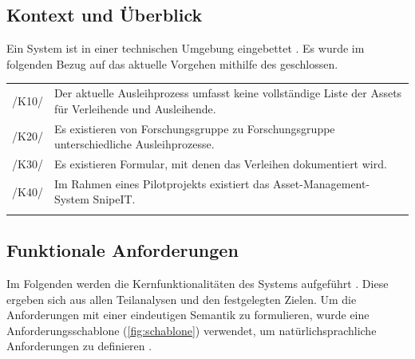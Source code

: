 \vspace*{-1.5cm}
\subsection{Kontext und Überblick}
\label{section:kontextueberblick}
Ein System ist in einer technischen Umgebung eingebettet \cite{balzert2009}. Es wurde im folgenden
Bezug auf das aktuelle Vorgehen mithilfe des  geschlossen.

\begin{center}
        \renewcommand{\arraystretch}{1.5}
        \begin{longtable}{lp{}} \arrayrulecolor{maincolor}\hline
                \sffamily\color{maincolor}/K10/ & Der aktuelle Ausleihprozess umfasst keine
                vollständige Liste der Assets für Verleihende und Ausleihende.                    \\
                \sffamily\color{maincolor}/K20/ & Es existieren von Forschungsgruppe zu
                Forschungsgruppe unterschiedliche Ausleihprozesse.                                \\
                \sffamily\color{maincolor}/K30/ & Es existieren Formular, mit denen das Verleihen
                dokumentiert wird.                                                                \\
                \sffamily\color{maincolor}/K40/ & Im Rahmen eines Pilotprojekts existiert das
                Asset-Management-System SnipeIT.                                                  \\
                \arrayrulecolor{maincolor}\hline
        \end{longtable}
\end{center}

\vspace*{-1.5cm}

\subsection{Funktionale Anforderungen}
\label{section:funktionale}
Im Folgenden werden die Kernfunktionalitäten des Systems aufgeführt \cite{balzert2009}. Diese
ergeben sich aus allen Teilanalysen und den festgelegten Zielen. Um die Anforderungen mit einer
eindeutigen Semantik zu formulieren, wurde eine Anforderungsschablone (\ref{fig:schablone})
verwendet, um natürlichsprachliche Anforderungen zu definieren \cite{balzert2009}.

